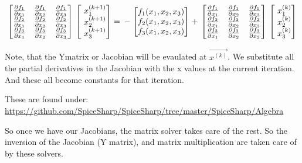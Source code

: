 \documentclass[12pt]{article}
\renewcommand{\_}{\kern-1.5pt\textunderscore\kern-1.5pt}
\begin{document}
$$ \begin{bmatrix}
\frac{\partial f_1}{\partial x_1}  & \frac{\partial f_1}{\partial x_2}  & \frac{\partial f_1}{\partial x_3} \\
\frac{\partial f_2}{\partial x_1}  & \frac{\partial f_2}{\partial x_2}  & \frac{\partial f_2}{\partial x_3} \\
\frac{\partial f_3}{\partial x_1}  & \frac{\partial f_3}{\partial x_2}  & \frac{\partial f_3}{\partial x_3} 
\end{bmatrix} \\ 
\begin{bmatrix}
\ x_1^{(k+1)}  \\
\ x_2^{(k+1)} \\
\ x_3^{(k+1)} 
\end{bmatrix} = \\
-\begin{bmatrix}
f_1 (x_1,x_2,x_3) \\
f_2 (x_1,x_2,x_3) \\
f_3 (x_1,x_2,x_3)
\end{bmatrix} + \\
\begin{bmatrix}
\frac{\partial f_1}{\partial x_1}  & \frac{\partial f_1}{\partial x_2}  & \frac{\partial f_1}{\partial x_3} \\
\frac{\partial f_2}{\partial x_1}  & \frac{\partial f_2}{\partial x_2}  & \frac{\partial f_2}{\partial x_3} \\
\frac{\partial f_3}{\partial x_1}  & \frac{\partial f_3}{\partial x_2}  & \frac{\partial f_3}{\partial x_3} 
\end{bmatrix} \\
\begin{bmatrix}
\ x_1^{(k)} \\
\ x_2^{(k)}\\
\ x_3^{(k)}
\end{bmatrix}
$$

Note, that the Ymatrix or Jacobian will be evaulated at \textbf{$\overrightarrow{x^{(k)}}$}. We substitute all the partial derivatives in the Jacobian with the x values at the current iteration. And these all become constants for that iteration.


These are found under:
\url{https://github.com/SpiceSharp/SpiceSharp/tree/master/SpiceSharp/Algebra}

So once we have our Jacobians, the matrix solver takes care of the rest.
So the inversion of the Jacobian (Y matrix), and matrix multiplication are taken care of by these solvers.
\end{document}
